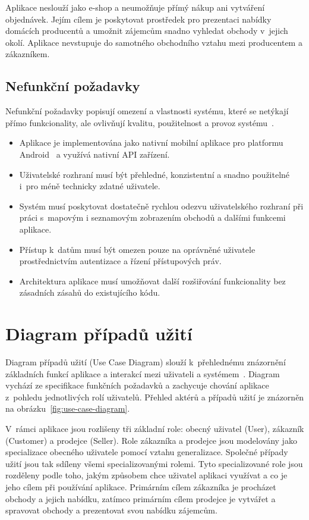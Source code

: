 Aplikace neslouží jako e-shop a neumožňuje přímý nákup ani vytváření objednávek.
Jejím cílem je poskytovat prostředek pro prezentaci nabídky domácích producentů a umožnit zájemcům snadno vyhledat obchody v~jejich okolí.
Aplikace nevstupuje do samotného obchodního vztahu mezi producentem a zákazníkem.

\subsection{Nefunkční požadavky}

Nefunkční požadavky popisují omezení a vlastnosti systému, které se netýkají přímo funkcionality, ale ovlivňují kvalitu, použitelnost a provoz systému~\parencite{somerville_se}.

\begin{itemize}
    \item Aplikace je implementována jako nativní mobilní aplikace pro platformu Android~\parencite{android_developers} a využívá nativní API zařízení.
    \item Uživatelské rozhraní musí být přehledné, konzistentní a snadno použitelné i~pro méně technicky zdatné uživatele.
    \item Systém musí poskytovat dostatečně rychlou odezvu uživatelského rozhraní při práci s~mapovým i seznamovým zobrazením obchodů a dalšími funkcemi aplikace.
    \item Přístup k~datům musí být omezen pouze na oprávněné uživatele prostřednictvím autentizace a řízení přístupových práv.
    \item Architektura aplikace musí umožňovat další rozšiřování funkcionality bez zásadních zásahů do existujícího kódu.
\end{itemize}


\section{Diagram případů užití}
Diagram případů užití (Use Case Diagram) slouží k~přehlednému znázornění základních funkcí aplikace a interakcí mezi uživateli a systémem~\parencite{somerville_se}.
Diagram vychází ze specifikace funkčních požadavků a zachycuje chování aplikace z~pohledu jednotlivých rolí uživatelů.
Přehled aktérů a případů užití je znázorněn na obrázku~\ref{fig:use-case-diagram}.

V~rámci aplikace jsou rozlišeny tři základní role: obecný uživatel (User), zákazník (Customer) a prodejce (Seller).
Role zákazníka a prodejce jsou modelovány jako specializace obecného uživatele pomocí vztahu generalizace.
Společné případy užití jsou tak sdíleny všemi specializovanými rolemi.
Tyto specializované role jsou rozděleny podle toho, jakým způsobem chce uživatel aplikaci využívat a co je jeho cílem při používání aplikace.
Primárním cílem zákazníka je procházet obchody a jejich nabídku, zatímco primárním cílem prodejce je vytvářet a spravovat obchody a prezentovat svou nabídku zájemcům.

